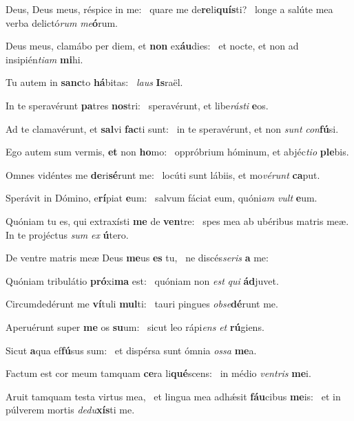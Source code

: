 \item Deus, Deus meus, réspice in me:~\pscross{} quare me de\textbf{re}li\textbf{quís}ti?~\psstar{} longe a salúte mea verba delictó\textit{rum} \textit{me}\textbf{ó}rum.
\item Deus meus, clamábo per diem, et \textbf{non} ex\textbf{áu}dies:~\psstar{} et nocte, et non ad insipién\textit{tiam} \textbf{mi}hi.
\item Tu autem in \textbf{sanc}to \textbf{há}bitas:~\psstar{} \textit{laus} \textbf{Is}raël.
\item In te speravérunt \textbf{pa}tres \textbf{nos}tri:~\psstar{} speravérunt, et libe\textit{rásti} \textbf{e}os.
\item Ad te clamavérunt, et \textbf{sal}vi \textbf{fac}ti sunt:~\psstar{} in te speravérunt, et non \textit{sunt} \textit{con}\textbf{fú}si.
\item Ego autem sum vermis, \textbf{et} non \textbf{ho}mo:~\psstar{} oppróbrium hóminum, et abjéc\textit{tio} \textbf{ple}bis.
\item Omnes vidéntes me \textbf{de}ri\textbf{sé}runt me:~\psstar{} locúti sunt lábiis, et mo\textit{vérunt} \textbf{ca}put.
\item Sperávit in Dómino, e\textbf{rí}piat \textbf{e}um:~\psstar{} salvum fáciat eum, quóni\textit{am} \textit{vult} \textbf{e}um.
\item Quóniam tu es, qui extraxísti \textbf{me} de \textbf{ven}tre:~\psstar{} spes mea ab ubéribus matris meæ. In te projéctus \textit{sum} \textit{ex} \textbf{ú}tero.
\item De ventre matris meæ Deus \textbf{me}us \textbf{es} tu,~\psstar{} ne discés\textit{seris} \textbf{a} me:
\item Quóniam tribulátio \textbf{pró}xi\textbf{ma} est:~\psstar{} quóniam non \textit{est} \textit{qui} \textbf{ád}juvet.
\item Circumdedérunt me \textbf{ví}tuli \textbf{mul}ti:~\psstar{} tauri pingues \textit{obse}\textbf{dé}runt me.
\item Aperuérunt super \textbf{me} os \textbf{su}um:~\psstar{} sicut leo rápi\textit{ens} \textit{et} \textbf{rú}giens.
\item Sicut \textbf{a}qua ef\textbf{fú}sus sum:~\psstar{} et dispérsa sunt ómnia \textit{ossa} \textbf{me}a.
\item Factum est cor meum tamquam \textbf{ce}ra li\textbf{qué}scens:~\psstar{} in médio \textit{ventris} \textbf{me}i.
\item Aruit tamquam testa virtus mea,~\pscross{} et lingua mea adhǽsit \textbf{fáu}cibus \textbf{me}is:~\psstar{} et in púlverem mortis \textit{dedu}\textbf{xís}ti me.
